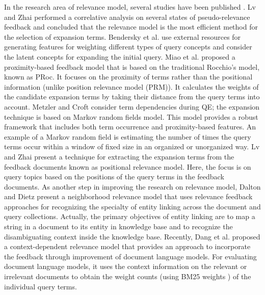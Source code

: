 In the research area of relevance model, several studies have been published \cite{lv2010positional,bendersky2011parameterized,miao2012proximity}. Lv and Zhai \cite{lv2009positional} performed a correlative analysis on several states of pseudo-relevance feedback and concluded that the relevance model is the most efficient method for the selection of expansion terms. Bendersky et al. \cite{bendersky2011parameterized} use external resources for generating features for weighting different types of query concepts and consider the latent concepts for expanding the initial query. Miao et al. \cite{miao2012proximity} proposed a proximity-based feedback model that is based on the traditional Rocchio's model, known as PRoc. It focuses on the proximity of terms rather than the positional information (unlike position relevance model (PRM)\cite{miao2012proximity}). It calculates the weights of the candidate expansion terms by taking their distance from the query terms into account. Metzler and Croft \cite{metzler2007latent} consider term dependencies during QE; the expansion technique is based on Markov random fields model. This model provides a robust framework that includes both term occurrence and proximity-based features. An example of a Markov random field is estimating the number of times the query terms occur within a window of fixed size in an organized or unorganized way. Lv and Zhai \cite{lv2010positional} present a technique for extracting the expansion terms from the feedback documents known as positional relevance model. Here, the focus is on query topics based on the positions of the query terms in the feedback documents. As another step in improving the research on relevance model, Dalton and Dietz \cite{dalton2013neighborhood} present a neighborhood relevance model that uses relevance feedback approaches for recognizing the specialty of entity linking across the document and query collections. Actually, the primary objectives of entity linking are to map a string in a document to its entity in knowledge base and to recognize the disambiguating context inside the knowledge base. Recently, Dang et al. \cite{dang2016context} proposed a context-dependent relevance model that provides an approach to incorporate the feedback through improvement of document language models. For evaluating document language models, it uses the context information on the relevant or irrelevant documents to obtain the weight counts (using BM25 weights \cite{robertson1994some,robertson2004understanding}) of the individual query terms.

